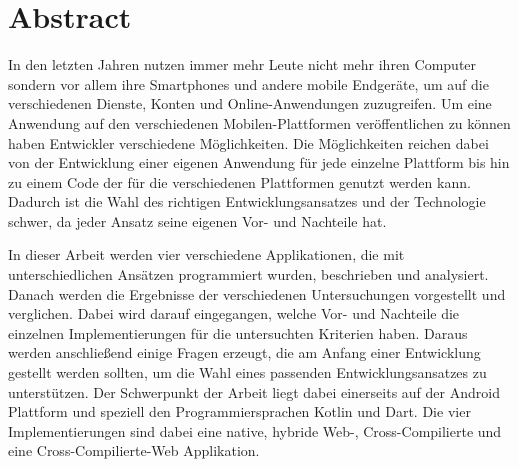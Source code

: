 \chapter*{Abstract}

\bigskip 

In den letzten Jahren nutzen immer mehr Leute nicht mehr ihren Computer sondern vor allem ihre Smartphones und andere mobile Endgeräte, um auf die verschiedenen Dienste, Konten und Online-Anwendungen zuzugreifen. Um eine Anwendung auf den verschiedenen Mobilen-Plattformen veröffentlichen zu können haben Entwickler verschiedene Möglichkeiten. Die Möglichkeiten reichen dabei von der Entwicklung einer eigenen Anwendung für jede einzelne Plattform bis hin zu einem Code der für die verschiedenen Plattformen genutzt werden kann. Dadurch ist die Wahl des richtigen Entwicklungsansatzes und der Technologie schwer, da jeder Ansatz seine eigenen Vor- und Nachteile hat. 

In dieser Arbeit werden vier verschiedene Applikationen, die mit unterschiedlichen Ansätzen programmiert wurden, beschrieben und analysiert. Danach werden die Ergebnisse der verschiedenen Untersuchungen vorgestellt und verglichen. Dabei wird darauf eingegangen, welche Vor- und Nachteile die einzelnen Implementierungen für die untersuchten Kriterien haben. Daraus werden anschließend einige Fragen erzeugt, die am Anfang einer Entwicklung gestellt werden sollten, um die Wahl eines passenden Entwicklungsansatzes zu unterstützen. Der Schwerpunkt der Arbeit liegt dabei einerseits auf der Android Plattform und speziell den Programmiersprachen Kotlin und Dart. Die vier Implementierungen sind dabei eine native, hybride Web-, Cross-Compilierte und eine Cross-Compilierte-Web Applikation.
